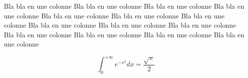 \documentclass{article}
\begin{document}
Bla bla en une colonne Bla bla en une colonne Bla bla en une colonne Bla bla en une colonne Bla bla en une colonne Bla bla en une colonne Bla bla en une colonne Bla bla en une colonne Bla bla en une colonne Bla bla en une colonne Bla bla en une colonne Bla bla en une colonne Bla bla en une colonne Bla bla en une colonne 

\begin{multicols}{2}
\lipsum[1]
\end{multicols}

\[ \int_0^{+\infty} e^{-x^2}dx = \frac{\sqrt{\pi}}{2} \]


\begin{multicols}{2}
\lipsum[1]
\end{multicols}
\end{document}
